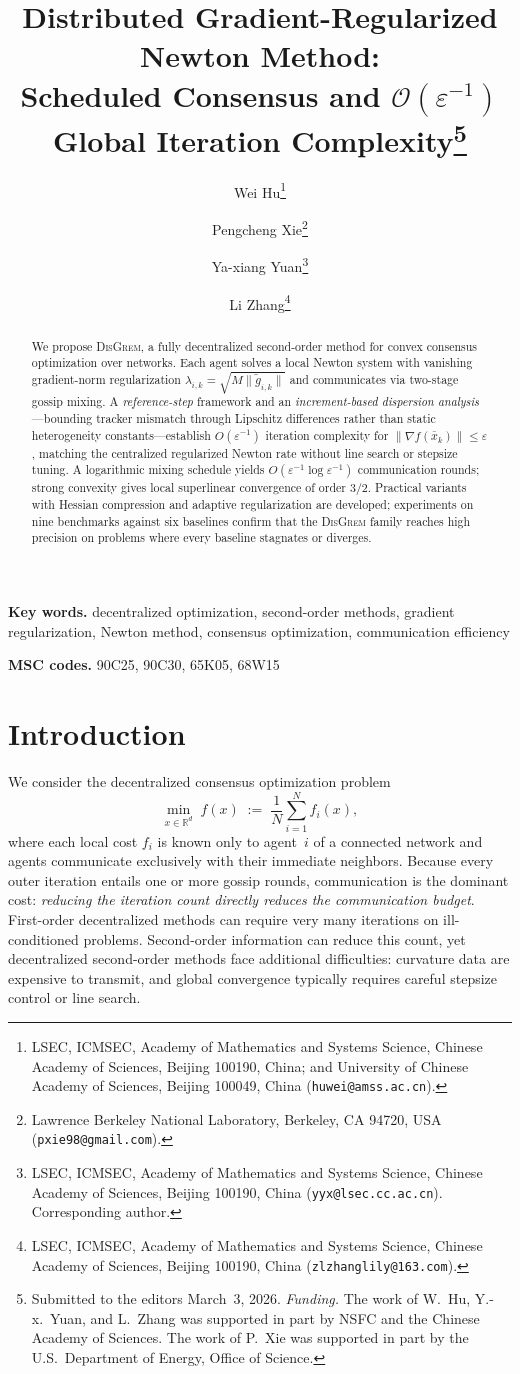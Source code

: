 \documentclass[11pt,a4paper]{article}
\title{Distributed Gradient-Regularized Newton Method:\\
		Scheduled Consensus and \texorpdfstring{$\mathcal{O}(\varepsilon^{-1})$}{O(eps\^{}-1)} Global Iteration Complexity\thanks{Submitted to the editors March~3, 2026.
\textit{Funding.}
The work of W.~Hu, Y.-x.~Yuan, and L.~Zhang was supported in part by NSFC and the Chinese Academy of Sciences.
The work of P.~Xie was supported in part by the U.S.\ Department of Energy, Office of Science.}}
\author{
	Wei Hu\thanks{
		LSEC, ICMSEC, Academy of Mathematics and Systems Science,
		Chinese Academy of Sciences, Beijing 100190, China;
		and University of Chinese Academy of Sciences, Beijing 100049, China
		(\texttt{huwei@amss.ac.cn}).
	}
	\and
	Pengcheng Xie\thanks{
		Lawrence Berkeley National Laboratory,
		Berkeley, CA 94720, USA
		(\texttt{pxie98@gmail.com}).
	}
	\and
	Ya-xiang Yuan\thanks{
		LSEC, ICMSEC, Academy of Mathematics and Systems Science,
		Chinese Academy of Sciences, Beijing 100190, China
		(\texttt{yyx@lsec.cc.ac.cn}).
		Corresponding author.
	}
	\and
	Li Zhang\thanks{
		LSEC, ICMSEC, Academy of Mathematics and Systems Science,
		Chinese Academy of Sciences, Beijing 100190, China
		(\texttt{zlzhanglily@163.com}).
	}
}
\date{}
\def\cO{O}%
\newcommand{\R}{\mathbb{R}}
\newcommand{\cO}{\mathcal{O}}
\begin{document}
	\maketitle

\begin{abstract}
We propose \textsc{DisGrem}, a fully decentralized second-order method
for convex consensus optimization over networks.
Each agent solves a local Newton system with vanishing
gradient-norm regularization $\lambda_{i,k}=\sqrt{M\|\tilde g_{i,k}\|}$
and communicates via two-stage gossip mixing.
A \emph{reference-step} framework and an \emph{increment-based
dispersion analysis}---bounding tracker mismatch through Lipschitz
differences rather than static heterogeneity constants---establish
$\cO(\varepsilon^{-1})$ iteration complexity for
$\|\nabla f(\bar x_k)\|\le\varepsilon$, matching the centralized
regularized Newton rate without line search or stepsize tuning.
A logarithmic mixing schedule yields
$\cO(\varepsilon^{-1}\log\varepsilon^{-1})$ communication rounds;
strong convexity gives local superlinear convergence of order $3/2$.
Practical variants with Hessian compression and adaptive
regularization are developed; experiments on nine benchmarks
against six baselines confirm that the \textsc{DisGrem} family reaches high
precision on problems where every baseline stagnates or diverges.
\end{abstract}

\medskip
\noindent\textbf{Key words.}
decentralized optimization, second-order methods, gradient regularization, Newton method, consensus optimization, communication efficiency

\medskip
\noindent\textbf{MSC codes.}
90C25, 90C30, 65K05, 68W15

	\section{Introduction}\label{sec:intro}
	We consider the decentralized consensus optimization problem
	\begin{equation}\label{eq:intro_prob}
		\min_{x\in\R^d}\; f(x)\;:=\;\frac{1}{N}\sum_{i=1}^N f_i(x),
	\end{equation}
	where each local cost $f_i$ is known only to agent~$i$ of a
	connected network and agents communicate exclusively with their
	immediate neighbors.
	Because every outer iteration entails one or more gossip rounds,
	communication is the dominant cost:
	\emph{reducing the iteration count directly reduces
	the communication budget}.
	First-order decentralized methods can require very many
	iterations on ill-conditioned problems.
	Second-order information can reduce this count, yet
	decentralized second-order methods face additional difficulties:
	curvature data are expensive to transmit, and global convergence
	typically requires careful stepsize control or line search.
\end{document}
